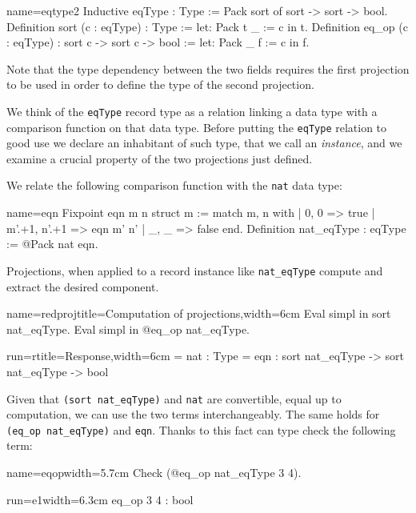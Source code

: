\begin{coq}{name=eqtype2}{}
Inductive eqType : Type :=
  Pack sort of sort -> sort -> bool.
Definition sort (c : eqType) : Type :=
  let: Pack t _ := c in t.
Definition eq_op (c : eqType) : sort c -> sort c -> bool :=
  let: Pack _ f := c in f.
\end{coq}

Note that the type dependency between the two fields requires the first
projection to be used in order to define the type of the second projection.

We think of the \lstinline/eqType/ record type as a relation linking a
data type with a comparison function on that data type.  Before
putting the \lstinline/eqType/ relation to good use we declare an
inhabitant of such type, that we call an \emph{instance}, and we
examine a crucial property of the two projections just defined.

We relate the following comparison function with the \lstinline/nat/
data type: 

\begin{coq}{name=eqn}{}
Fixpoint eqn m n {struct m} :=
  match m, n with
  | 0, 0 => true
  | m'.+1, n'.+1 => eqn m' n'
  | _, _ => false
  end.
Definition nat_eqType : eqType := @Pack nat eqn.
\end{coq}

Projections, when applied to a record instance like
\lstinline/nat_eqType/ compute and extract the desired component.

\begin{coq}{name=redproj}{title=Computation of projections,width=6cm}
Eval simpl in sort nat_eqType.
Eval simpl in @eq_op nat_eqType.
\end{coq}
\begin{coqout}{run=r}{title=Response,width=6cm}
= nat : Type
= eqn : sort nat_eqType ->
         sort nat_eqType -> bool
\end{coqout}

Given that \lstinline/(sort nat_eqType)/ and \lstinline/nat/
are convertible, equal up to computation, we can use the two terms
interchangeably.  The same holds for \lstinline/(eq_op nat_eqType)/
and \lstinline/eqn/.  Thanks to this fact \Coq{} can type check the
following term:

\begin{coq}{name=eqop}{width=5.7cm}
Check (@eq_op nat_eqType 3 4).
\end{coq}
\begin{coqout}{run=e1}{width=6.3cm}
eq_op 3 4 : bool
\end{coqout}

